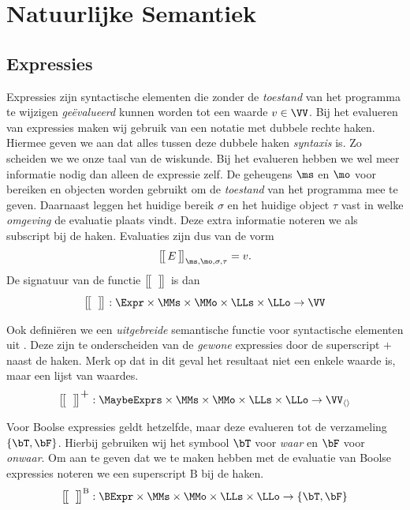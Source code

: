 \chapter{Natuurlijke Semantiek}

\section{Expressies}

Expressies zijn syntactische elementen die zonder de \emph{toestand} van het programma te wijzigen \emph{geëvalueerd} kunnen worden tot een waarde $v \in \VV$. 
Bij het evalueren van expressies maken wij gebruik van een notatie met dubbele rechte haken. Hiermee geven we aan dat alles tussen deze dubbele haken \emph{syntaxis} is. Zo scheiden we we onze taal van de wiskunde. Bij het evalueren hebben we wel meer informatie nodig dan alleen de expressie zelf. De geheugens $\ms$ en $\mo$ voor bereiken en objecten worden gebruikt om de \emph{toestand} van het programma mee te geven. Daarnaast leggen het huidige bereik $\sigma$ en het huidige object $\tau$ vast in welke \emph{omgeving} de evaluatie plaats vindt. Deze extra informatie noteren we als subscript bij de haken. Evaluaties zijn dus van de vorm
%
\begin{equation*}
  \Express{E}{\ms,\mo,\sigma,\tau} = v.
\end{equation*}
%
De signatuur van de functie $\big[\!\big[\,\;\,\big]\!\big]^\text{}_{}$ is dan
\begin{equation*}
  \Express{\;}{} : \Expr \times \MMs \times \MMo \times \LLs \times \LLo \to \VV \\
\end{equation*}

Ook definiëren we een \emph{uitgebreide} semantische functie voor syntactische elementen uit \MaybeExprs. Deze zijn te onderscheiden van de \emph{gewone} expressies door de superscript $+$ naast de haken. Merk op dat in dit geval het resultaat niet een enkele waarde is, maar een lijst van waardes.
\begin{equation*}
  \Express[\scalebox{1.3}{$+$}]{\;}{} : \MaybeExprs \times \MMs \times \MMo \times \LLs \times \LLo \to \VV_{\langle\rangle}
\end{equation*}

Voor Boolse expressies geldt hetzelfde, maar deze evalueren tot de verzameling $\{\bT, \bF\}$.
Hierbij gebruiken wij het symbool $\bT$ voor \emph{waar} en $\bF$ voor \emph{onwaar}.
Om aan te geven dat we te maken hebben met de evaluatie van Boolse expressies noteren we een superscript $\text{B}$ bij de haken.
%
\begin{equation*}
  \Express[B]{\;}{} : \BExpr \times \MMs \times \MMo \times \LLs \times \LLo \to \{ \bT, \bF \} \\
\end{equation*}

